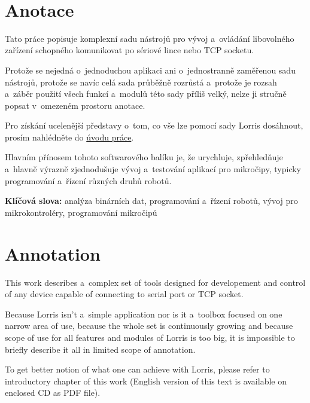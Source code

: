 \documentclass[12pt, a4paper, oneside]{article}
\newcommand{\D}{\medskip \noindent} %
\newcommand{\B}{\textbf} %
\begin{document}
\newpage   %
~ %
\vspace{-20mm}

\section*{Anotace}

Tato práce popisuje komplexní sadu nástrojů pro vývoj a~ovládání libovolného zařízení schopného komunikovat po sériové lince nebo TCP socketu.

Protože se nejedná o~jednoduchou aplikaci ani o~jednostranně zaměřenou sadu nástrojů, protože se navíc celá sada průběžně rozrůstá a~protože je rozsah a~záběr použití všech funkcí a~modulů této sady příliš velký, nelze ji stručně popsat v~omezeném prostoru anotace.

Pro získání ucelenější představy o~tom, co vše lze pomocí sady Lorris dosáhnout, prosím nahlédněte do \hyperref[uvod]{úvodu práce}.


Hlavním přínosem tohoto softwarového balíku je, že urychluje, zpřehledňuje a~hlavně výrazně zjednodušuje vývoj a~testování aplikací pro mikročipy, typicky programování a~řízení různých druhů robotů.

\D \B{Klíčová slova:} analýza binárních dat, programování a~řízení robotů, vývoj pro mikrokontroléry, programování mikročipů

\section*{Annotation}

This work describes a~complex set of tools designed for developement and control of any device capable of connecting to serial port or TCP socket.

Because Lorris isn't a~simple application nor is it a~toolbox focused on one narrow area of use, because the whole set is continuously growing and because scope of use for all features and modules of Lorris is too big, it is impossible to briefly describe it all in limited scope of annotation.

To get better notion of what one can achieve with Lorris, please refer to introductory chapter of this work (English version of this text is available on enclosed CD as PDF file).
\end{document}

